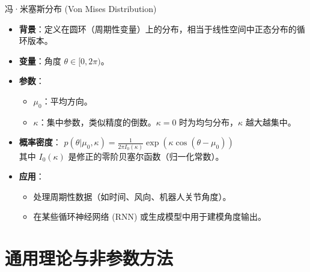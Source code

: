 \documentclass[12pt, aspectratio=169]{beamer}
\begin{document}
\begin{frame}{冯·米塞斯分布 (Von Mises Distribution)}
    \begin{itemize}
        \item \textbf{背景}：定义在圆环（周期性变量）上的分布，相当于线性空间中正态分布的循环版本。
        \item \textbf{变量}：角度 $\theta \in [0, 2\pi)$。
        \item \textbf{参数}：
        \begin{itemize}
            \item $\mu_0$：平均方向。
            \item $\kappa$：集中参数，类似精度的倒数。$\kappa=0$ 时为均匀分布，$\kappa$ 越大越集中。
        \end{itemize}
        \item \textbf{概率密度}：
        $\displaystyle p(\theta|\mu_0, \kappa) = \frac{1}{2\pi I_0(\kappa)} \exp(\kappa \cos(\theta - \mu_0)) $ \\ 
        其中 $I_0(\kappa)$ 是修正的零阶贝塞尔函数（归一化常数）。
        \item \textbf{应用}：
        \begin{itemize}
            \item 处理周期性数据（如时间、风向、机器人关节角度）。
            \item 在某些循环神经网络 (RNN) 或生成模型中用于建模角度输出。
        \end{itemize}
    \end{itemize}
\end{frame}

\section{通用理论与非参数方法}
\end{document}
